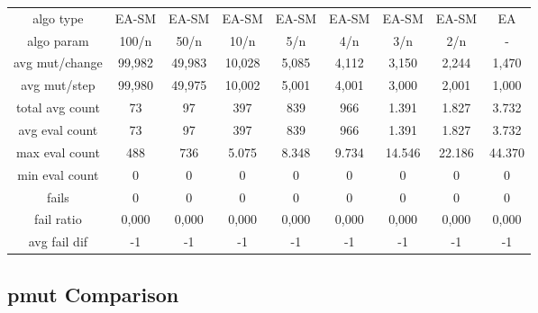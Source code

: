 \begin{tabular}[h]{ccccccccc}
algo type&         EA-SM&  EA-SM&  EA-SM&  EA-SM&  EA-SM&  EA-SM&  EA-SM&     EA\\
algo param&        100/n&   50/n&   10/n&    5/n&    4/n&    3/n&    2/n&      -\\
avg mut/change&   99,982& 49,983& 10,028&  5,085&  4,112&  3,150&  2,244&  1,470\\
avg mut/step&     99,980& 49,975& 10,002&  5,001&  4,001&  3,000&  2,001&  1,000\\
\hline
total avg count&      73&     97&    397&    839&    966&  1.391&  1.827&  3.732\\
avg eval count&       73&     97&    397&    839&    966&  1.391&  1.827&  3.732\\
max eval count&      488&    736&  5.075&  8.348&  9.734& 14.546& 22.186& 44.370\\
min eval count&        0&      0&      0&      0&      0&      0&      0&      0\\
\hline
fails&                 0&      0&      0&      0&      0&      0&      0&      0\\
fail ratio&        0,000&  0,000&  0,000&  0,000&  0,000&  0,000&  0,000&  0,000\\
avg fail dif&         -1&     -1&     -1&     -1&     -1&     -1&     -1&     -1\\
\end{tabular}


\subsection{pmut Comparison}


